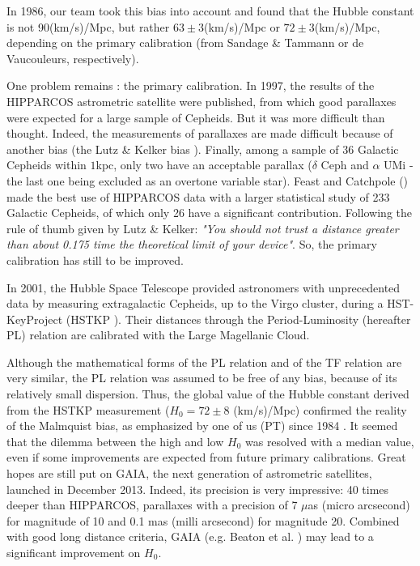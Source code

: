 In 1986, our team took this bias into account \cite{Ref14,Ref15} and found that the Hubble constant is not 90(km/s)/Mpc, but rather $63 \pm 3$(km/s)/Mpc or $72 \pm 3$(km/s)/Mpc, depending on the primary calibration (from Sandage \& Tammann or de  Vaucouleurs,  respectively).

One problem remains : the primary calibration. 
In 1997, the results of the HIPPARCOS astrometric satellite were published, from which good parallaxes were  expected for a large sample of Cepheids. But it was more difficult than thought. Indeed, the measurements of parallaxes are made difficult because of another bias (the Lutz \& Kelker bias \cite{lutz}). Finally, among a sample of 36 Galactic Cepheids within $1$kpc, only two have an acceptable parallax ($\delta$ Ceph and $\alpha$ UMi - the last one being excluded as an overtone variable star). Feast and Catchpole (\cite{feast}) made the best use of  HIPPARCOS data with a larger statistical study of 233 Galactic Cepheids, of which  only 26 have a significant contribution. Following the rule of thumb given by Lutz \& Kelker: {\it{ "You should not trust a distance greater than about 0.175 time the theoretical limit of your device"}}. So, the primary calibration has still to be improved.

In 2001, the Hubble Space Telescope provided astronomers with unprecedented data by measuring extragalactic Cepheids, up to the Virgo cluster, during a HST-KeyProject  (HSTKP \cite{Ref19}). Their distances through the Period-Luminosity (hereafter PL) relation are calibrated with the Large Magellanic Cloud.

 Although the mathematical forms of the PL relation and of the TF relation are very similar, the PL relation was assumed to be free of any bias, because of its relatively small dispersion. Thus, the global value of the Hubble constant derived from the HSTKP measurement ($H_0=72 \pm 8 $ (km/s)/Mpc) confirmed the reality of the Malmquist bias, as emphasized  by one of us (PT) since 1984 \cite{pt84}. 
It seemed that the dilemma between the high and low $H_0$ was resolved with a median value, even if some improvements are expected from future primary calibrations. Great hopes are still put on GAIA, the next generation of astrometric satellites, launched in December 2013. Indeed, its precision is very impressive: 40 times deeper than HIPPARCOS, parallaxes with a precision of 7 $\mu$as  (micro arcsecond) for magnitude of 10 and 0.1 mas (milli arcsecond) for magnitude 20. Combined with good long distance criteria, GAIA (e.g. Beaton et al. \cite{beaton}) may lead to a significant improvement on $H_0$.

